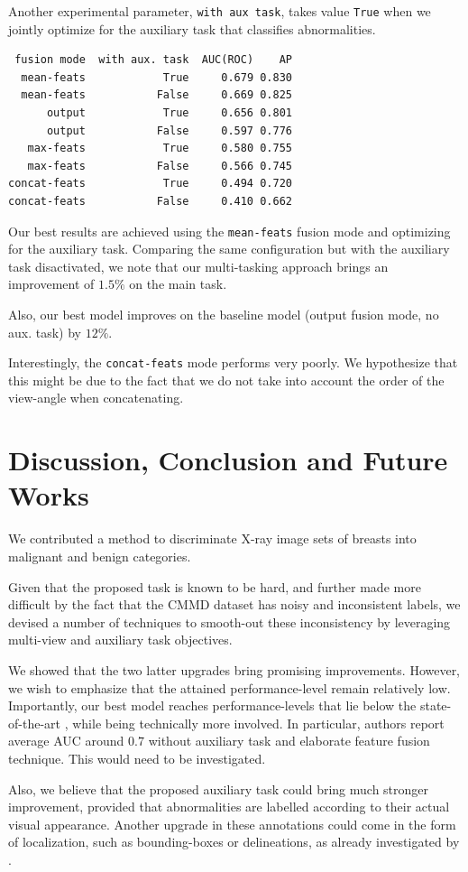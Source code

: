\documentclass[11pt]{article}
\begin{document}
Another experimental parameter, \texttt{with aux task}, takes value \texttt{True} when we jointly optimize for the
auxiliary task that classifies abnormalities.

\begin{verbatim}
 fusion mode  with aux. task  AUC(ROC)    AP
  mean-feats            True     0.679 0.830
  mean-feats           False     0.669 0.825
      output            True     0.656 0.801
      output           False     0.597 0.776
   max-feats            True     0.580 0.755
   max-feats           False     0.566 0.745
concat-feats            True     0.494 0.720
concat-feats           False     0.410 0.662
\end{verbatim}


Our best results are achieved using the \texttt{mean-feats} fusion mode and
optimizing for the auxiliary task.
Comparing the same configuration but with the auxiliary task disactivated,
we note that our multi-tasking approach brings an improvement of \(1.5\%\) on the main task.

Also, our best model improves on the baseline model
(output fusion mode, no aux. task) by \(12\%\).

Interestingly, the \texttt{concat-feats} mode performs very poorly.
We hypothesize that this might be due to the fact
that we do not take into account the order of the view-angle when
concatenating.

\section{Discussion, Conclusion and Future Works}
\label{sec:orgc805c30}

We contributed a method to discriminate X-ray image sets of breasts into malignant and benign
categories.

Given that the proposed task is known to be hard, and further made more difficult by
the fact that the CMMD dataset has noisy and inconsistent labels,
we devised a number of techniques to smooth-out these inconsistency by
leveraging multi-view and auxiliary task objectives.

We showed that the two latter upgrades bring promising improvements.
However, we wish to emphasize that the attained performance-level remain relatively low.
Importantly, our best model reaches performance-levels that lie
below the state-of-the-art \autocite{tardy22}, while being technically more involved.
In particular, authors report average AUC around \(0.7\) without auxiliary task
and elaborate feature fusion technique. This would need to be investigated.

Also, we believe that the proposed auxiliary task could bring much stronger
improvement, provided that abnormalities are labelled according to their actual
visual appearance. Another upgrade in these annotations could come in the form
of localization, such as bounding-boxes or delineations, as already investigated by \autocite{tang19}.



\printbibliography
\end{document}
